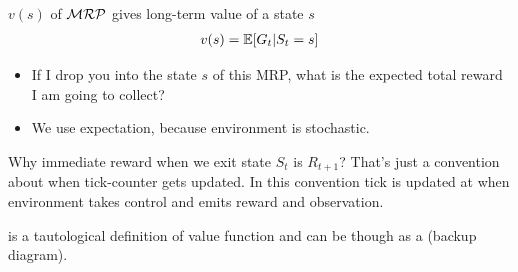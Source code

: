  $v(s)$ of $\mathcal{MRP}$ gives long-term value of a state $s$
\begin{align}
	v(s) = \operatorname{\mathbb{E}}[G_t | S_t = s]
\end{align}
\begin{itemize}
	\item If I drop you into the state $s$ of this MRP, what is the expected total reward I am going to collect?
	\item We use expectation, because environment is stochastic.
\end{itemize}


\begin{notebox}
	Why immediate reward when we exit state $S_t$ is $R_{t+1}$? That's just a convention about when tick-counter gets updated. In this convention tick is updated at when environment takes control and emits reward and observation.
\end{notebox}

 is a tautological definition of value function and can be though as a  (backup diagram).



